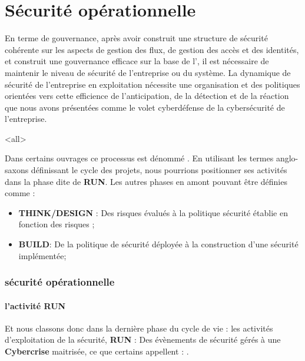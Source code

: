 %
%


\section{Sécurité opérationnelle}

En terme de gouvernance, après avoir construit une structure de sécurité cohérente sur les aspects de gestion des flux, de gestion des accès et des identités, et construit une gouvernance efficace sur la base de l', il est  nécessaire de maintenir le niveau de sécurité de l'entreprise ou du système. La dynamique de sécurité de l'entreprise en exploitation nécessite une organisation et des politiques orientées vers cette efficience de l'anticipation, de la détection et de la réaction que nous avons présentées comme le volet cyberdéfense de la cybersécurité de l'entreprise.


\mode<all>{
{
Dans certains ouvrages ce processus est dénommé  . En utilisant  les termes anglo-saxons définissant le cycle des projets, nous pourrions positionner ses activités dans la phase dite de  \textbf{RUN}. Les autres phases en amont pouvant être définies comme : 

\begin{itemize}
 \item \textbf{THINK/DESIGN} : Des risques évalués à la politique sécurité établie en fonction des risques ;
 \item \textbf{BUILD}: De la politique de sécurité déployée à la construction d’une sécurité implémentée;
\end{itemize}
}} %




\begin{frame}
\frametitle<presentation>{sécurité opérationnelle}
\framesubtitle<presentation>{l'activité RUN}

Et nous classons donc dans la dernière phase du cycle de vie : les activités d'exploitation de la sécurité, \textbf{RUN} : Des évènements de sécurité gérés à une \textbf{Cybercrise} maitrisée, ce que certains appellent \textbf{} : .
\end{frame}


